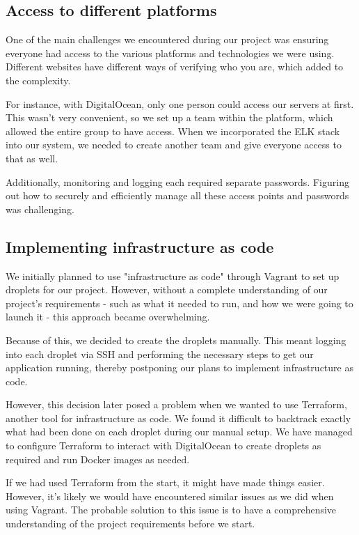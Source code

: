 \subsection{Access to different platforms}
One of the main challenges we encountered during our project was ensuring everyone had access to the various platforms and technologies we were using. Different websites have different ways of verifying who you are, which added to the complexity.

For instance, with DigitalOcean, only one person could access our servers at first. This wasn't very convenient, so we set up a team within the platform, which allowed the entire group to have access. When we incorporated the ELK stack into our system, we needed to create another team and give everyone access to that as well.

Additionally, monitoring and logging each required separate passwords. Figuring out how to securely and efficiently manage all these access points and passwords was challenging.

\subsection{Implementing infrastructure as code}
We initially planned to use "infrastructure as code" through Vagrant to set up droplets for our project. However, without a complete understanding of our project's requirements - such as what it needed to run, and how we were going to launch it - this approach became overwhelming.

Because of this, we decided to create the droplets manually. This meant logging into each droplet via SSH and performing the necessary steps to get our application running, thereby postponing our plans to implement infrastructure as code.

However, this decision later posed a problem when we wanted to use Terraform, another tool for infrastructure as code. We found it difficult to backtrack exactly what had been done on each droplet during our manual setup. We have managed to configure Terraform to interact with DigitalOcean to create droplets as required and run Docker images as needed. 

If we had used Terraform from the start, it might have made things easier. However, it's likely we would have encountered similar issues as we did when using Vagrant. The probable solution to this issue is to have a comprehensive understanding of the project requirements before we start.


